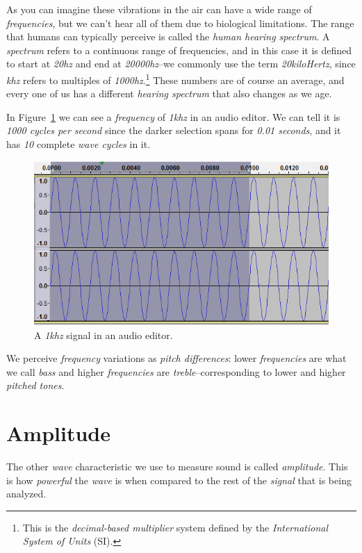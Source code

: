 \documentclass[10pt,a4paper]{report}
\newcommand{\ac}[1]{\textit{\mbox{\acrshort{#1}}}}
\newcommand{\hz}[1]{\textit{\mbox{#1\acrshort{hz}}}}
\newcommand{\khz}[1]{\textit{\mbox{#1\acrshort{khz}}}}
\begin{document}
As you can imagine these vibrations in the air can have a wide range of \textit{frequencies}, but we can't hear all of them due to biological limitations. The range that humans can typically perceive is called the \textit{human hearing spectrum}. A \textit{spectrum} refers to a continuous range of frequencies, and in this case it is defined to start at \hz{20} and end at \hz{20000}--we commonly use the term \textit{20kiloHertz}, since \ac{khz} refers to multiples of \hz{1000}.\footnote{This is the \textit{decimal-based multiplier} system defined by the \textit{International System of Units} (SI).} These numbers are of course an average, and every one of us has a different \textit{hearing spectrum} that also changes as we age.

In Figure~\ref{fig:frequency} we can see a \textit{frequency} of \khz{1} in an audio editor. We can tell it is \textit{1000 cycles per second} since the darker selection spans for \textit{0.01 seconds}, and it has \textit{10} complete \textit{wave cycles} in it.

\begin{figure}[H]
	\centering
	\includegraphics[width=0.8\linewidth]{images/audio/frequency.png}
	\caption[Frequency]{A \khz{1} signal in an audio editor.}
	\label{fig:frequency}
\end{figure}

We perceive \textit{frequency} variations as \textit{pitch differences}: lower \textit{frequencies} are what we call \textit{bass} and higher \textit{frequencies} are \textit{treble}--corresponding to lower and higher \textit{pitched tones}.

\section{Amplitude}

The other \textit{wave} characteristic we use to measure sound is called \textit{amplitude}. This is how \textit{powerful} the \textit{wave} is when compared to the rest of the \textit{signal} that is being analyzed. 
\end{document}
